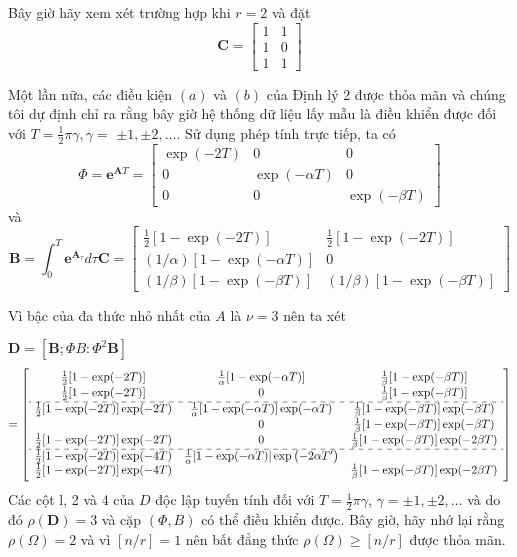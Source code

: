 \documentclass[12pt,a4paper]{article}
\begin{document}
Bây giờ hãy xem xét trường hợp khi $r=2$ và đặt
$$
\mathbf{C}=\left[\begin{array}{ll}
	1 & 1 \\
	1 & 0 \\
	1 & 1
\end{array}\right]
$$

Một lần nữa, các điều kiện $(a)$ và $(b)$ của Định lý 2 được thỏa mãn và chúng tôi dự định chỉ ra rằng bây giờ hệ thống dữ liệu lấy mẫu là điều khiển được đối với $T=\frac{1}{2} \pi \gamma, \gamma=$ $\pm 1, \pm 2, \ldots$. Sử dụng phép tính trực tiếp, ta có
$$
\Phi=\mathbf{e}^{\mathbf{A} T}=\left[\begin{array}{ccc}
	\exp (-2 T) & 0 & 0 \\
	0 & \exp (-\alpha T) & 0 \\
	0 & 0 & \exp (-\beta T)
\end{array}\right]
$$
và
$$
\mathbf{B}=\int_0^T \mathbf{e}^{\mathbf{A}_\tau} d \tau \mathbf{C}=\left[\begin{array}{cc}
	\frac{1}{2}[1-\exp (-2 T)] & \frac{1}{2}[1-\exp (-2 T)] \\
	(1 / \alpha)[1-\exp (-\alpha T)] & 0 \\
	(1 / \beta)[1-\exp (-\beta T)] & (1 / \beta)[1-\exp (-\beta T)]
\end{array}\right]
$$

Vì bậc của đa thức nhỏ nhất của $A$ là $\nu=3$ nên ta xét

$\mathbf{D}=\left[\mathbf{B} ; \Phi B: \Phi^2 \mathbf{B}\right]$
{\small
$$=\left[\begin{array}{ccc}\frac{1}{2}[1-\exp (-2 T)] & \frac{1}{\alpha}[1-\exp (-\alpha T)] & \frac{1}{\beta}[1-\exp (-\beta T)] \\ \frac{1}{2}[1-\exp (-2 T)] & 0 & \frac{1}{\beta}[1-\exp (-\beta T)] \\ \hdashline \frac{1}{2}[1-\exp (-2 T)] \exp (-2 T) & \frac{1}{\alpha}[1-\exp (-\alpha T)] \exp (-\alpha T) & \frac{1}{\beta}[1-\exp (-\beta T)] \exp (-\beta T) \\ & 0 & \frac{1}{\beta}[1-\exp (-\beta T)] \exp (-\beta T) \\ \frac{1}{2}[1-\exp (-2 T)] \exp (-2 T) & 0 & \frac{1}{\beta}[1-\exp (-\beta T)] \exp (-2 \beta T) \\ \hdashline \frac{1}{2}[1-\exp (-2 T)] \exp (-4 T) & \frac{1}{\alpha}[1-\exp (-\alpha T)] \exp \left(-2 \alpha T^{\prime}\right) \\ \frac{1}{2}[1-\exp (-2 T)] \exp (-4 T) & & \frac{1}{\beta}[1-\exp (-\beta T)] \exp (-2 \beta T)\end{array}\right]$$
}
Các cột l, 2 và 4 của $D$ độc lập tuyến tính đối với $T=\frac{1}{2} \pi \gamma$, $\gamma= \pm 1, \pm 2, \ldots$ và do đó $\rho(\mathbf{D})=3$ và cặp $(\Phi, B)$ có thể điều khiển được. Bây giờ, hãy nhớ lại rằng $\rho(\Omega)=2$ và vì $[n / r]=1$ nên bất đẳng thức $\rho(\Omega) \geqslant[n / r]$ được thỏa mãn.
\end{document}
